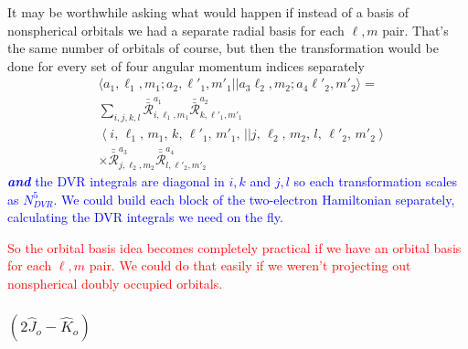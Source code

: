 \documentclass[%
pra%
,twocolumn%
,amssymb, nobibnotes, aps,
longbibliography
]{revtex4-1}
\begin{document}
It may be worthwhile asking what would happen if instead of a basis of nonspherical orbitals we had a separate radial basis for each $\ell,m$ pair.  That's the same number of orbitals of course, but then the transformation would be done for every set of four angular momentum indices separately
\begin{equation}
\begin{split}
&\langle a_1,\ell_1,m_1; a_2 ,\ell'_1,m'_1|| a_3 \ell_2,m_2; a_4\ell'_2,m'_2 \rangle = \\
&\sum_{i,j,k,l}
\bar{\bar{{\mathcal{R}}}}_{i,\ell_1,m_1}^{a_1} 
\bar{\bar{{\mathcal{R}}}}_{k,\ell'_1,m'_1}^{a_2}  \\
&\left<  i ,\, \ell_1, \, m_1, \, k ,\, \ell'_1, \, m'_1, \, ||
j, \,\ell_2, \, m_2, \,  l, \,\ell'_2, \, m'_2 \right> \\
&\times \bar{\bar{{\mathcal{R}}}}_{j,\ell_2,m_2}^{a_3} 
\bar{\bar{{\mathcal{R}}}}_{l,\ell'_2,m'_2}^{a_4} 
\end{split}
\end{equation}
\textcolor{blue}{\textbf{\textit{and}} the DVR integrals are diagonal in $i,k$ and $j,l$ so each transformation scales as $N_{DVR}^5$.  We could build each block of the two-electron Hamiltonian separately, calculating the DVR integrals we need on the fly.}

\textcolor{red}{So the orbital basis idea becomes completely practical if we have an orbital basis for each $\ell,m$ pair.  We could do that easily if we weren't projecting out nonspherical doubly occupied orbitals.}


\subsubsection{$\left( 2 \hat{J}_o - \hat{K}_o \right)$} 



\appendix
\end{document}
